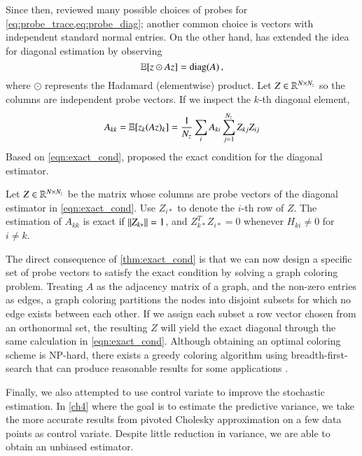 Since then, \citet{avron2011randomized} reviewed many possible choices of probes
for \cref{eq:probe_trace,eq:probe_diag}; another common choice is vectors with
independent standard normal entries. On the other hand,  
\citet{bekas2007estimator} has extended the idea for diagonal estimation by
observing
\begin{equation}\label{eq:probe_diag}
	\operatorname{\mathbb{E}}[z\odot Az] = \operatorname{diag}(A)\,,
\end{equation}
where $\odot$ represents the Hadamard (elementwise) product. Let $Z\in\mathbb{R}^
{N\mathbin{\times} N_z}$ so the columns are independent probe vectors. If we inspect the
$k$\hyp{}th diagonal element,
\begin{equation}\label{eqn:exact_cond}
	A_{kk} = \operatorname{\mathbb{E}}[z_k(Az)_k] = \frac{1}{N_z}\sum_{i}A_{ki}\sum_{j=1}^{N_z}Z_{kj}Z_
	{ij}
\end{equation}
Based on \cref{eqn:exact_cond}, \citet{bekas2007estimator} proposed the exact
condition for the diagonal estimator.

\begin{theorem}\label{thm:exact_cond}
Let $Z\in\mathbb{R}^{N\times N_z}$ be the matrix whose columns are probe vectors of
the diagonal estimator in \cref{eqn:exact_cond}. Use $Z_{i\ast}$ to denote the
$i$\hyp{}th row of $Z$. The estimation of $A_{kk}$ is exact if $\left\lVert Z_
{k\ast}\right\rVert = 1$, and $Z_{k\ast}^TZ_{i\ast} = 0$ whenever $H_{ki}\neq 0$ for $i\neq
k$.
\end{theorem}

The direct consequence of \cref{thm:exact_cond} is that we can now design a
specific set of probe vectors to satisfy the exact condition by solving a graph
coloring problem. Treating $A$ as the adjacency matrix of a graph, and the
non\hyp{}zero entries as edges, a graph coloring partitions the nodes into
disjoint subsets for which no edge exists between each other. If we assign each
subset a row vector chosen from an orthonormal set, the resulting $Z$ will yield
the exact diagonal through the same calculation in \cref{eqn:exact_cond}.
Although obtaining an optimal coloring scheme is NP\hyp{}hard, there exists a
greedy coloring algorithm using breadth\hyp{}first\hyp{}search that can produce
reasonable results for some applications \cite[Theorem~28.33]
{arumugam2016handbook}.

Finally, we also attempted to use control variate to improve the stochastic
estimation. In \cref{ch4} where the goal is to estimate the predictive variance,
we take the more accurate results from pivoted Cholesky approximation on a few
data points as control variate. Despite little reduction in variance, we
are able to obtain an unbiased estimator.

